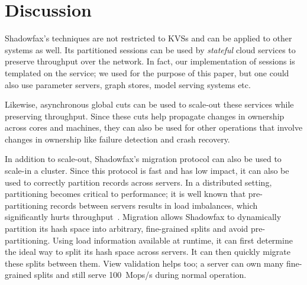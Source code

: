 \section{Discussion}
\label{sec:discussion}

Shadowfax's techniques are not restricted to KVSs and can be applied to
other systems as well.
%
Its partitioned sessions can be used by \emph{stateful} cloud services
to preserve throughput over the network.
%
In fact, our implementation of sessions is templated on the service; we
used \faster for the purpose of this paper, but one could also use
parameter servers, graph stores, model serving systems etc.

Likewise, asynchronous global cuts can be used to scale-out these
services while preserving throughput.
%
Since these cuts help propagate changes in ownership
across cores and machines, they can also be used for other operations
that involve changes in ownership like
failure detection and crash recovery.

In addition to scale-out, Shadowfax's migration protocol can also be
used to scale-in a cluster.
%
Since this protocol is fast and has low impact, it can also be used to
correctly partition records across servers.
%
In a distributed setting, partitioning becomes critical to
performance; it is well known that pre-partitioning records between
servers results in load imbalances, which significantly hurts
throughput~\cite{dynamo,slicer}.
%
Migration allows Shadowfax to
dynamically partition its hash space into arbitrary, fine-grained splits
and
avoid pre-partitioning.
%
Using load information available at runtime, it can first determine the ideal
way to split its hash space across servers.
%
It can then quickly migrate these splits
between them.
%
View validation helps too; a server can own many fine-grained splits and still
serve 100~Mops/s during normal operation.

